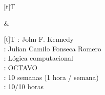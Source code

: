 \documentclass[letterpaper,10pt,spanish]{sphinxmanual}
\begin{document}
\begin{savenotes}\sphinxattablestart
\sphinxthistablewithglobalstyle
\centering
\begin{tabular}[t]{}
\sphinxtoprule
\sphinxtableatstartofbodyhook

\begin{savenotes}\sphinxattablestart
\sphinxthistablewithglobalstyle
\centering
\begin{tabulary}{\linewidth}[t]{T}
\sphinxtoprule
\sphinxtableatstartofbodyhook
\sphinxAtStartPar
{}
\\
\sphinxbottomrule
\end{tabulary}
\sphinxtableafterendhook\par
\sphinxattableend\end{savenotes}
&

\begin{savenotes}\sphinxattablestart
\sphinxthistablewithglobalstyle
\centering
\begin{tabulary}{\linewidth}[t]{T}
\sphinxtoprule
\sphinxtableatstartofbodyhook
\sphinxAtStartPar
{}: John F. Kennedy
\\
\sphinxhline
\sphinxAtStartPar
{}: Julian Camilo Fonseca Romero
\\
\sphinxhline
\sphinxAtStartPar
{}: Lógica computacional
\\
\sphinxhline
\sphinxAtStartPar
{}: OCTAVO
\\
\sphinxhline
\sphinxAtStartPar
{}: 10 semanas (1 hora / semana)
\\
\sphinxhline
\sphinxAtStartPar
{}: 10/10 horas
\\
\sphinxbottomrule
\end{tabulary}
\sphinxtableafterendhook\par
\sphinxattableend\end{savenotes}
\\
\sphinxbottomrule
\end{tabular}
\sphinxtableafterendhook\par
\sphinxattableend\end{savenotes}
\end{document}
